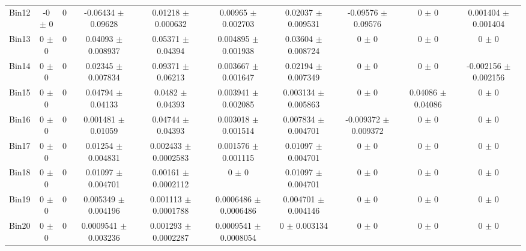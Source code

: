 \begin{tabular}{@{\extracolsep{4pt}}lccccccccc@{}}
     Bin12 & -0 $\pm$ 0 & 0 & -0.06434 $\pm$ 0.09628 & 0.01218 $\pm$ 0.000632 & 0.00965 $\pm$ 0.002703 & 0.02037 $\pm$ 0.009531 & -0.09576 $\pm$ 0.09576 & 0 $\pm$ 0 & 0.001404 $\pm$ 0.001404 \\ 
     Bin13 & 0 $\pm$ 0 & 0 & 0.04093 $\pm$ 0.008937 & 0.05371 $\pm$ 0.04394 & 0.004895 $\pm$ 0.001938 & 0.03604 $\pm$ 0.008724 & 0 $\pm$ 0 & 0 $\pm$ 0 & 0 $\pm$ 0 \\ 
     Bin14 & 0 $\pm$ 0 & 0 & 0.02345 $\pm$ 0.007834 & 0.09371 $\pm$ 0.06213 & 0.003667 $\pm$ 0.001647 & 0.02194 $\pm$ 0.007349 & 0 $\pm$ 0 & 0 $\pm$ 0 & -0.002156 $\pm$ 0.002156 \\ 
     Bin15 & 0 $\pm$ 0 & 0 & 0.04794 $\pm$ 0.04133 & 0.0482 $\pm$ 0.04393 & 0.003941 $\pm$ 0.002085 & 0.003134 $\pm$ 0.005863 & 0 $\pm$ 0 & 0.04086 $\pm$ 0.04086 & 0 $\pm$ 0 \\ 
     Bin16 & 0 $\pm$ 0 & 0 & 0.001481 $\pm$ 0.01059 & 0.04744 $\pm$ 0.04393 & 0.003018 $\pm$ 0.001514 & 0.007834 $\pm$ 0.004701 & -0.009372 $\pm$ 0.009372 & 0 $\pm$ 0 & 0 $\pm$ 0 \\ 
     Bin17 & 0 $\pm$ 0 & 0 & 0.01254 $\pm$ 0.004831 & 0.002433 $\pm$ 0.0002583 & 0.001576 $\pm$ 0.001115 & 0.01097 $\pm$ 0.004701 & 0 $\pm$ 0 & 0 $\pm$ 0 & 0 $\pm$ 0 \\ 
     Bin18 & 0 $\pm$ 0 & 0 & 0.01097 $\pm$ 0.004701 & 0.00161 $\pm$ 0.0002112 & 0 $\pm$ 0 & 0.01097 $\pm$ 0.004701 & 0 $\pm$ 0 & 0 $\pm$ 0 & 0 $\pm$ 0 \\ 
     Bin19 & 0 $\pm$ 0 & 0 & 0.005349 $\pm$ 0.004196 & 0.001113 $\pm$ 0.0001788 & 0.0006486 $\pm$ 0.0006486 & 0.004701 $\pm$ 0.004146 & 0 $\pm$ 0 & 0 $\pm$ 0 & 0 $\pm$ 0 \\ 
     Bin20 & 0 $\pm$ 0 & 0 & 0.0009541 $\pm$ 0.003236 & 0.001293 $\pm$ 0.0002287 & 0.0009541 $\pm$ 0.0008054 & 0 $\pm$ 0.003134 & 0 $\pm$ 0 & 0 $\pm$ 0 & 0 $\pm$ 0 \\ 
\hline\hline
  \end{tabular}
